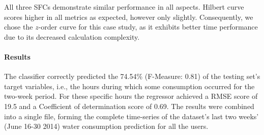 \begin{table}[!ht]
\centering
\caption{Space Filling Curves' performance.}
\label{table2}
\end{table}

All three SFCs demonstrate similar performance in all aspects. Hilbert curve scores higher in all metrics as expected, however only slightly. Consequently, we chose the $z$-order curve for this case study, as it exhibits better time performance due to its decreased calculation complexity.

\paragraph{Results}
\label{par:res1}
The classifier correctly predicted the 74.54\% (F-Measure: 0.81) of the testing set's target variables, i.e., the hours during which some consumption occurred for the two-week period. For these specific hours the regressor achieved a RMSE score of 19.5 and a Coefficient of determination score of 0.69. The results were combined into a single file, forming the complete time-series of the dataset's last two weeks' (June 16-30 2014) water consumption prediction for all the users. 

